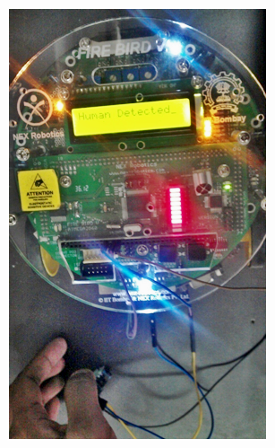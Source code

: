 \documentclass[table,10pt,red]{beamer}	%
\begin{document}
\begin{frame}
\begin{minipage}[c]{0.49\textwidth}
			\includegraphics[width=0.8\linewidth]{out2.png}
	\end{minipage}


		
\end{frame}
\end{document}
